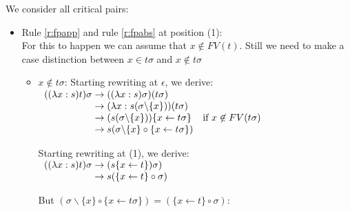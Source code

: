 \documentclass[a4paper]{article}
\newcommand{\fpsubstin}[1]{\{#1\}}
\newcommand{\fpscat}[0]{\circ}
\newcommand{\fpwith}{\leftarrow}
\newcommand{\fpwithoutset}[1]{\backslash\{#1\}}
\newcommand{\rewrites}[0]{\;\rightarrow\;}
\begin{document}
We consider all critical pairs:
\begin{itemize}
\item Rule \ref{r:fpapp} and rule \ref{r:fpabs} at position (1):\\
  For this to happen we can assume that $x \not \in FV(t)$. Still we need to
  make a case distinction between $x \in t\sigma$ and $x \not \in t\sigma$\\

  \begin{itemize}
  \item $x \not \in t\sigma$: Starting rewriting at $\epsilon$, we derive:\\
    $
    \begin{array}{r@{\rewrites}ll}
      ((\lambda x:s)t)\sigma & ((\lambda x:s)\sigma)(t\sigma) & \\
                             & (\lambda x : s(\sigma\fpwithoutset{x}))
                               (t\sigma) & \\
                             & (s(\sigma\fpwithoutset{x}))\fpsubstin{
                               x \fpwith t\sigma} &  \mbox{if }x \not
                                                    \in FV(t\sigma )\\
                             & s(\sigma\fpwithoutset{x} \fpscat
                               \fpsubstin{x \fpwith t\sigma}) & \\
    \end{array}
    $

    Starting rewriting at (1), we derive:\\

    $
    \begin{array}{r@{\rewrites}l}
      ((\lambda x:s)t)\sigma & (s\fpsubstin{x \fpwith t})\sigma ) \\
                             & s(\fpsubstin{x \fpwith t} \fpscat \sigma ) \\
    \end{array}
    $

    But $(\sigma\fpwithoutset{x} \fpscat \fpsubstin{x \fpwith t\sigma}) =
    (\fpsubstin{x \fpwith t} \fpscat \sigma)$:


\end{itemize}
\end{itemize}
\end{document}
